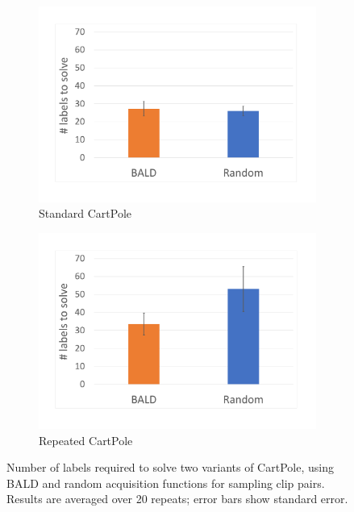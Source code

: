 \documentclass[11pt, a4paper, bibliography=totoc]{report}
\begin{document}
\begin{figure}[h]
	\centering
	\begin{subfigure}{.5\textwidth}
		\centering
		\includegraphics[width=\linewidth]{rand_bald_cartpole_final}
		\caption{Standard CartPole}
		\label{fig:sub1}
	\end{subfigure}%
	\begin{subfigure}{.5\textwidth}
		\centering
		\includegraphics[width=\linewidth]{cartpole_rep}
		\caption{Repeated CartPole}
		\label{fig:sub2}
	\end{subfigure}
	\caption{Number of labels required to solve two variants of CartPole, using BALD and random acquisition functions for sampling clip pairs. Results are averaged over 20 repeats; error bars show standard error.}
	\label{fig:cartpole_rep}
\end{figure}
\end{document}
